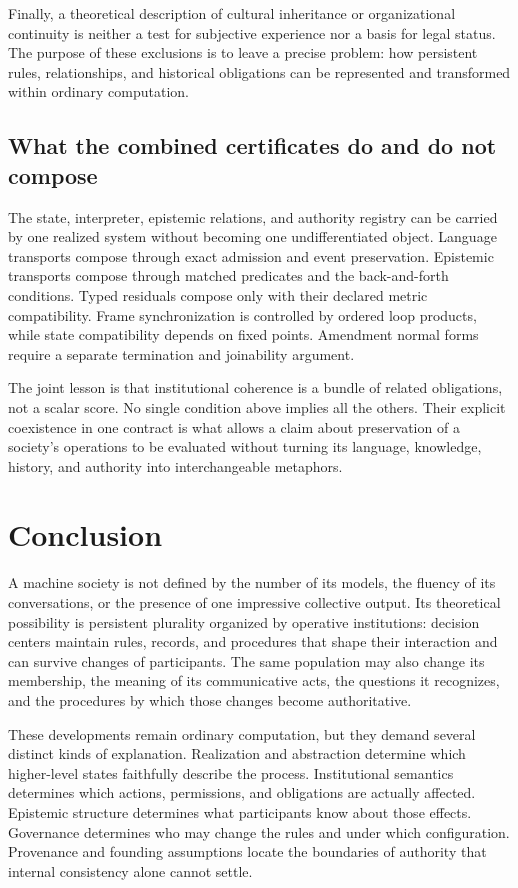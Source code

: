\documentclass[11pt,letterpaper]{article}
\theoremstyle{plain}
\theoremstyle{definition}
\theoremstyle{remark}
\begin{document}
Finally, a theoretical description of cultural inheritance or organizational continuity is neither a test for subjective experience nor a basis for legal status. The purpose of these exclusions is to leave a precise problem: how persistent rules, relationships, and historical obligations can be represented and transformed within ordinary computation.

\subsection{What the combined certificates do and do not compose}
The state, interpreter, epistemic relations, and authority registry can be carried by one realized system without becoming one undifferentiated object. Language transports compose through exact admission and event preservation. Epistemic transports compose through matched predicates and the back-and-forth conditions. Typed residuals compose only with their declared metric compatibility. Frame synchronization is controlled by ordered loop products, while state compatibility depends on fixed points. Amendment normal forms require a separate termination and joinability argument.

The joint lesson is that institutional coherence is a bundle of related obligations, not a scalar score. No single condition above implies all the others. Their explicit coexistence in one contract is what allows a claim about preservation of a society's operations to be evaluated without turning its language, knowledge, history, and authority into interchangeable metaphors.

\section{Conclusion}\label{sec:conclusion}
A machine society is not defined by the number of its models, the fluency of its conversations, or the presence of one impressive collective output. Its theoretical possibility is persistent plurality organized by operative institutions: decision centers maintain rules, records, and procedures that shape their interaction and can survive changes of participants. The same population may also change its membership, the meaning of its communicative acts, the questions it recognizes, and the procedures by which those changes become authoritative.

These developments remain ordinary computation, but they demand several distinct kinds of explanation. Realization and abstraction determine which higher-level states faithfully describe the process. Institutional semantics determines which actions, permissions, and obligations are actually affected. Epistemic structure determines what participants know about those effects. Governance determines who may change the rules and under which configuration. Provenance and founding assumptions locate the boundaries of authority that internal consistency alone cannot settle.
\end{document}
